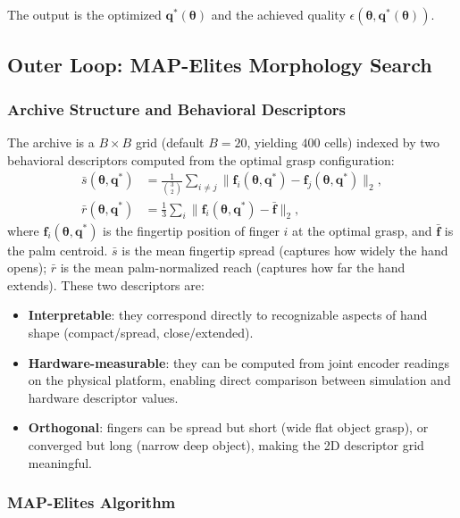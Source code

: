 \documentclass[journal]{IEEEtran}
\newcommand{\btheta}{\boldsymbol{\theta}}
\newcommand{\bq}{\mathbf{q}}
\newcommand{\eps}{\epsilon}
\begin{document}
The output is the optimized $\bq^*(\btheta)$ and the achieved quality
$\eps(\btheta, \bq^*(\btheta))$.

\subsection{Outer Loop: MAP-Elites Morphology Search}
\label{sec:outer}

\subsubsection{Archive Structure and Behavioral Descriptors}

The archive is a $B \times B$ grid (default $B = 20$, yielding $400$ cells) indexed by
two behavioral descriptors computed from the optimal grasp configuration:
\begin{align}
  \bar{s}(\btheta, \bq^*) &= \frac{1}{\binom{3}{2}} \sum_{i \neq j}
    \|\mathbf{f}_i(\btheta, \bq^*) - \mathbf{f}_j(\btheta, \bq^*)\|_2,
  \label{eq:spread} \\
  \bar{r}(\btheta, \bq^*) &= \frac{1}{3} \sum_i
    \|\mathbf{f}_i(\btheta, \bq^*) - \bar{\mathbf{f}}\|_2,
  \label{eq:reach}
\end{align}
where $\mathbf{f}_i(\btheta, \bq^*)$ is the fingertip position of finger $i$ at the
optimal grasp, and $\bar{\mathbf{f}}$ is the palm centroid.
$\bar{s}$ is the mean fingertip spread (captures how widely the hand opens); $\bar{r}$
is the mean palm-normalized reach (captures how far the hand extends).
These two descriptors are:
\begin{itemize}
  \item \textbf{Interpretable}: they correspond directly to recognizable aspects of hand
    shape (compact/spread, close/extended).
  \item \textbf{Hardware-measurable}: they can be computed from joint encoder readings
    on the physical platform, enabling direct comparison between simulation and hardware
    descriptor values.
  \item \textbf{Orthogonal}: fingers can be spread but short (wide flat object grasp),
    or converged but long (narrow deep object), making the 2D descriptor grid meaningful.
\end{itemize}

\subsubsection{MAP-Elites Algorithm}
\end{document}
